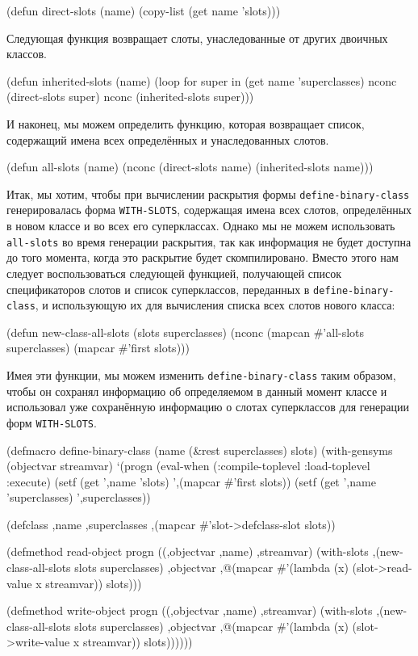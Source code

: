 \begin{myverb}
(defun direct-slots (name)
  (copy-list (get name 'slots)))
\end{myverb}

Следующая функция возвращает слоты, унаследованные от других двоичных классов.

\begin{myverb}
(defun inherited-slots (name)
  (loop for super in (get name 'superclasses)
        nconc (direct-slots super)
        nconc (inherited-slots super)))
\end{myverb}

И наконец, мы можем определить функцию, которая возвращает список, содержащий имена всех
определённых и унаследованных слотов.

\begin{myverb}
(defun all-slots (name)
  (nconc (direct-slots name) (inherited-slots name)))
\end{myverb}

Итак, мы хотим, чтобы при вычислении раскрытия формы \lstinline{define-binary-class}
генерировалась форма \lstinline{WITH-SLOTS}, содержащая имена всех слотов, определённых в
новом классе и во всех его суперклассах. Однако мы не можем использовать \lstinline{all-slots}
во время генерации раскрытия, так как информация не будет доступна до того момента, когда
это раскрытие будет скомпилировано. Вместо этого нам следует воспользоваться следующей
функцией, получающей список спецификаторов слотов и список суперклассов, переданных в
\lstinline{define-binary-class}, и использующую их для вычисления списка всех слотов нового
класса:

\begin{myverb}
(defun new-class-all-slots (slots superclasses)
  (nconc (mapcan #'all-slots superclasses) (mapcar #'first slots)))
\end{myverb}

Имея эти функции, мы можем изменить \lstinline{define-binary-class} таким образом, чтобы он
сохранял информацию об определяемом в данный момент классе и использовал уже сохранённую
информацию о слотах суперклассов для генерации форм \lstinline{WITH-SLOTS}.

\begin{myverb}
(defmacro define-binary-class (name (&rest superclasses) slots)
  (with-gensyms (objectvar streamvar)
    `(progn
       (eval-when (:compile-toplevel :load-toplevel :execute)
         (setf (get ',name 'slots) ',(mapcar #'first slots))
         (setf (get ',name 'superclasses) ',superclasses))

       (defclass ,name ,superclasses
         ,(mapcar #'slot->defclass-slot slots))

       (defmethod read-object progn ((,objectvar ,name) ,streamvar)
         (with-slots ,(new-class-all-slots slots superclasses) ,objectvar
           ,@(mapcar #'(lambda (x) (slot->read-value x streamvar)) slots)))

       (defmethod write-object progn ((,objectvar ,name) ,streamvar)
         (with-slots ,(new-class-all-slots slots superclasses) ,objectvar
           ,@(mapcar #'(lambda (x) (slot->write-value x streamvar)) slots))))))
\end{myverb}

